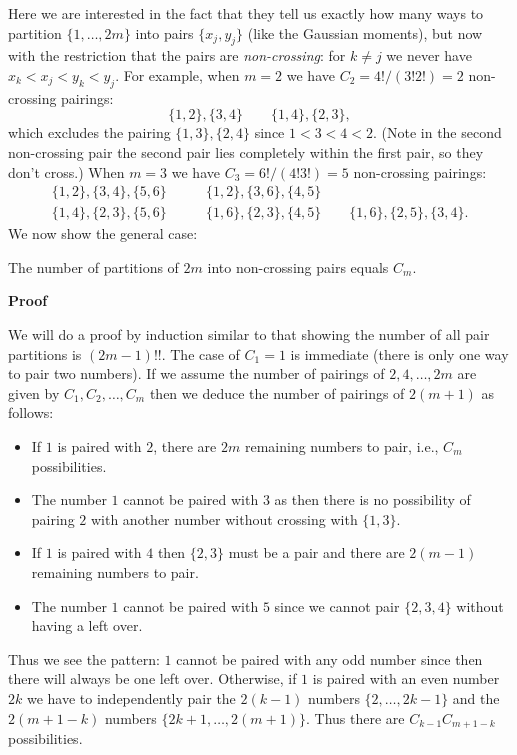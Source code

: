 Here we are interested in the fact that they tell us exactly how many ways to partition $\{1,\ensuremath{\ldots},2m\}$ into pairs $\{x_j,y_j\}$ (like the Gaussian moments), but now with the restriction that the pairs are \emph{non-crossing}: for $k \ensuremath{\neq} j$ we never have $x_k < x_j < y_k < y_j$. For example, when $m = 2$ we have $C_2 = 4!/(3!2!) = 2$ non-crossing pairings:
\[
\{1,2\}, \{3,4\} \qquad \{1,4\}, \{2,3\},
\]
which excludes the pairing $\{1,3\}, \{2,4\}$ since $1 < 3 < 4 < 2$. (Note in the second non-crossing pair the second pair lies completely within the first pair, so they don't cross.) When $m =3$ we have $C_3 = 6!/(4!3!) = 5$ non-crossing pairings:
\begin{align*}
\{1,2\}, \{3,4\}, \{5,6\} &\qquad \{1,2\}, \{3,6\}, \{4,5\} \\
\{1,4\}, \{2,3\}, \{5,6\} &\qquad \{1,6\}, \{2,3\}, \{4,5\} \qquad \{1,6\}, \{2,5\}, \{3,4\}.
\end{align*}
We now show the general case:

\begin{lemma} The number of partitions of $2m$ into non-crossing pairs equals $C_m$.

\end{lemma}
\textbf{Proof}

We will do a proof by induction similar to that showing the number of all pair partitions is $(2m-1)!!$.  The case of  $C_1 = 1$ is immediate (there is only one way to pair two numbers). If we assume the number of pairings of $2, 4, \ensuremath{\ldots}, 2m$ are given by $C_1,C_2,\ensuremath{\ldots},C_m$ then we deduce the number of pairings of $2(m+1)$ as follows:

\begin{itemize}
\item[1. ] If $1$ is paired with $2$, there are $2m$ remaining numbers to pair, i.e., $C_m$ possibilities.


\item[2. ] The number $1$ cannot be paired with $3$ as then there is no possibility of pairing $2$ with another number without crossing with $\{1,3\}$.


\item[3. ] If $1$ is paired with $4$ then $\{2,3\}$ must be a pair and there are $2(m-1)$ remaining numbers to pair. 


\item[4. ] The number $1$ cannot be paired with $5$ since we cannot pair $\{2,3,4\}$ without having a left over.

\end{itemize}
Thus we see the pattern: $1$ cannot be paired with any odd number since then there will always be one left over. Otherwise, if $1$ is paired with an even number $2k$ we have to independently pair the $2(k-1)$ numbers $\{2,\ensuremath{\ldots},2k-1\}$ and the $2(m+1-k)$ numbers $\{2k+1,\ensuremath{\ldots},2(m+1)\}$. Thus there are $C_{k-1} C_{m+1-k}$ possibilities.

